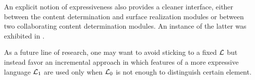 An explicit notion of expressiveness also provides a
cleaner interface, either between the content determination and
surface realization modules or between two collaborating content
determination modules. An instance of the latter was exhibited in
.

As a future line of research, one may want to avoid sticking to a
fixed $\mathcal{L}$ but instead favor an incremental approach in which
features of a more expressive language $\mathcal{L}_1$ are used only when
$\mathcal{L}_0$ is not enough to distinguish certain element.


%




